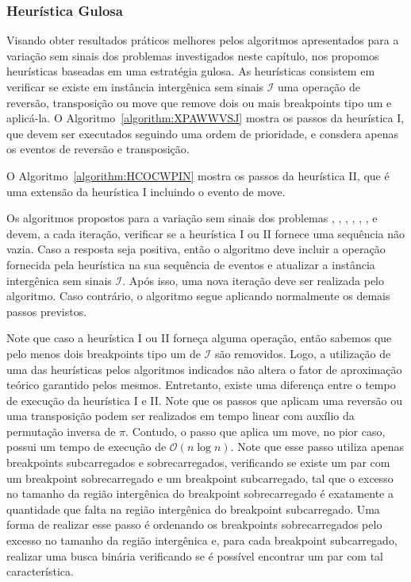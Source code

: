 \subsubsection{Heurística Gulosa}

Visando obter resultados práticos melhores pelos algoritmos apresentados para a variação sem sinais dos problemas investigados neste capítulo, nos propomos heurísticas baseadas em uma estratégia gulosa. As heurísticas consistem em verificar se existe em instância intergênica sem sinais $\mathcal{I}$ uma operação de reversão, transposição ou move que remove dois ou mais breakpoints tipo um e aplicá-la. O Algoritmo~\ref{algorithm:XPAWWVSJ} mostra os passos da heurística I, que devem ser executados seguindo uma ordem de prioridade, e consdera apenas os eventos de reversão e transposição.  



O Algoritmo~\ref{algorithm:HCOCWPIN} mostra os passos da heurística II, que é uma extensão da heurística I incluindo o evento de move.  



Os algoritmos propostos para a variação sem sinais dos problemas \SbIR{}, \SbIRI{}, \SbIRM{}, \SbIRMI{}, \SbIRT{}, \SbIRTI{}, \SbIRTM{} e \SbIRTMI{} devem, a cada iteração, verificar se a heurística I ou II fornece uma sequência não vazia. Caso a resposta seja positiva, então o algoritmo deve incluir a operação fornecida pela heurística na sua sequência de eventos e atualizar a instância intergênica sem sinais $\mathcal{I}$. Após isso, uma nova iteração deve ser realizada pelo algoritmo. Caso contrário, o algoritmo segue aplicando normalmente os demais passos previstos.

Note que caso a heurística I ou II forneça alguma operação, então sabemos que pelo menos dois breakpoints tipo um de $\mathcal{I}$ são removidos. Logo, a utilização de uma das heurísticas pelos algoritmos indicados não altera o fator de aproximação teórico garantido pelos mesmos. Entretanto, existe uma diferença entre o tempo de execução da heurística I e II. Note que os passos que aplicam uma reversão ou uma transposição podem ser realizados em tempo linear com auxílio da permutação inversa de $\pi$. Contudo, o passo que aplica um move, no pior caso, possui um tempo de execução de $\mathcal{O}(n\log n)$. Note que esse passo utiliza apenas breakpoints subcarregados e sobrecarregados, verificando se existe um par com um breakpoint sobrecarregado e um breakpoint subcarregado, tal que o excesso no tamanho da região intergênica do breakpoint sobrecarregado é exatamente a quantidade que falta na região intergênica do breakpoint subcarregado. Uma forma de realizar esse passo é ordenando os breakpoints sobrecarregados pelo excesso no tamanho da região intergênica e, para cada breakpoint subcarregado, realizar uma busca binária verificando se é possível encontrar um par com tal característica.

